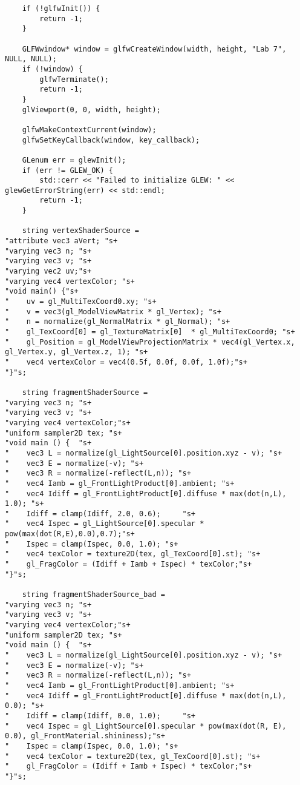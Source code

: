 \documentclass[a4paper, 14pt]{extarticle}
\begin{document}
\begin{verbatim}
    if (!glfwInit()) {
        return -1;
    }

    GLFWwindow* window = glfwCreateWindow(width, height, "Lab 7", NULL, NULL);
    if (!window) {
        glfwTerminate();
        return -1;
    }
    glViewport(0, 0, width, height);

    glfwMakeContextCurrent(window);
    glfwSetKeyCallback(window, key_callback);

    GLenum err = glewInit();
    if (err != GLEW_OK) {
        std::cerr << "Failed to initialize GLEW: " << glewGetErrorString(err) << std::endl;
        return -1;
    }
   
    string vertexShaderSource =
"attribute vec3 aVert; "s+
"varying vec3 n; "s+
"varying vec3 v; "s+
"varying vec2 uv;"s+
"varying vec4 vertexColor; "s+
"void main() {"s+
"    uv = gl_MultiTexCoord0.xy; "s+
"    v = vec3(gl_ModelViewMatrix * gl_Vertex); "s+
"    n = normalize(gl_NormalMatrix * gl_Normal); "s+
"    gl_TexCoord[0] = gl_TextureMatrix[0]  * gl_MultiTexCoord0; "s+
"    gl_Position = gl_ModelViewProjectionMatrix * vec4(gl_Vertex.x, gl_Vertex.y, gl_Vertex.z, 1); "s+
"    vec4 vertexColor = vec4(0.5f, 0.0f, 0.0f, 1.0f);"s+
"}"s;

    string fragmentShaderSource =
"varying vec3 n; "s+
"varying vec3 v; "s+
"varying vec4 vertexColor;"s+
"uniform sampler2D tex; "s+
"void main () {  "s+
"    vec3 L = normalize(gl_LightSource[0].position.xyz - v); "s+
"    vec3 E = normalize(-v); "s+
"    vec3 R = normalize(-reflect(L,n)); "s+
"    vec4 Iamb = gl_FrontLightProduct[0].ambient; "s+
"    vec4 Idiff = gl_FrontLightProduct[0].diffuse * max(dot(n,L), 1.0); "s+
"    Idiff = clamp(Idiff, 2.0, 0.6);     "s+
"    vec4 Ispec = gl_LightSource[0].specular * pow(max(dot(R,E),0.0),0.7);"s+
"    Ispec = clamp(Ispec, 0.0, 1.0); "s+
"    vec4 texColor = texture2D(tex, gl_TexCoord[0].st); "s+
"    gl_FragColor = (Idiff + Iamb + Ispec) * texColor;"s+
"}"s;

    string fragmentShaderSource_bad =
"varying vec3 n; "s+
"varying vec3 v; "s+
"varying vec4 vertexColor;"s+
"uniform sampler2D tex; "s+
"void main () {  "s+
"    vec3 L = normalize(gl_LightSource[0].position.xyz - v); "s+
"    vec3 E = normalize(-v); "s+
"    vec3 R = normalize(-reflect(L,n)); "s+
"    vec4 Iamb = gl_FrontLightProduct[0].ambient; "s+
"    vec4 Idiff = gl_FrontLightProduct[0].diffuse * max(dot(n,L), 0.0); "s+
"    Idiff = clamp(Idiff, 0.0, 1.0);     "s+
"    vec4 Ispec = gl_LightSource[0].specular * pow(max(dot(R, E), 0.0), gl_FrontMaterial.shininess);"s+
"    Ispec = clamp(Ispec, 0.0, 1.0); "s+
"    vec4 texColor = texture2D(tex, gl_TexCoord[0].st); "s+
"    gl_FragColor = (Idiff + Iamb + Ispec) * texColor;"s+
"}"s;


\end{verbatim}
\end{document}

